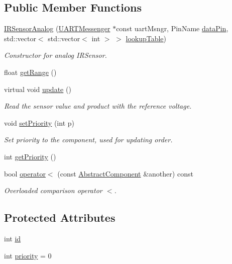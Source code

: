\subsection*{Public Member Functions}
\begin{DoxyCompactItemize}
\item 
\hyperlink{class_i_r_sensor_analog_af27166832035783b3df081014c4dfb9d}{I\+R\+Sensor\+Analog} (\hyperlink{class_u_a_r_t_messenger}{U\+A\+R\+T\+Messenger} $\ast$const uart\+Msngr, Pin\+Name \hyperlink{class_i_r_sensor_analog_a248c6a3f0a6a4e4867fd70c0ac0b3d76}{data\+Pin}, std\+::vector$<$ std\+::vector$<$ int $>$ $>$ \hyperlink{class_i_r_sensor_analog_a981d91e0de8f658d5c15ac5bfbe8ed6c}{lookup\+Table})
\begin{DoxyCompactList}\small\item\em Constructor for analog I\+R\+Sensor. \end{DoxyCompactList}\item 
float \hyperlink{class_i_r_sensor_analog_aa6642b85ec1018980e216eab0dfd27f2}{get\+Range} ()
\item 
virtual void \hyperlink{class_i_r_sensor_analog_a919942de7c5fc3af5da9a2b32e31d328}{update} ()
\begin{DoxyCompactList}\small\item\em Read the sensor value and product with the reference voltage. \end{DoxyCompactList}\item 
void \hyperlink{class_abstract_component_a58a59a9ea6c3b4c86fb3bf98ff1eaaef}{set\+Priority} (int p)
\begin{DoxyCompactList}\small\item\em Set priority to the component, used for updating order. \end{DoxyCompactList}\item 
int \hyperlink{class_abstract_component_ac0b440d1d642ff1292ec3c544d75a8f1}{get\+Priority} ()
\item 
bool \hyperlink{class_abstract_component_a0c2e458144111c5f599c66f168516abc}{operator$<$} (const \hyperlink{class_abstract_component}{Abstract\+Component} \&another) const
\begin{DoxyCompactList}\small\item\em Overloaded comparison operator \textquotesingle{}$<$\textquotesingle{}. \end{DoxyCompactList}\end{DoxyCompactItemize}
\subsection*{Protected Attributes}
\begin{DoxyCompactItemize}
\item 
int \hyperlink{class_abstract_component_a9c9c548149681b1a1dd935e66ed5dd11}{id}
\item 
int \hyperlink{class_abstract_component_aff57dfa5f31be093a06b55560e33fb95}{priority} = 0
\end{DoxyCompactItemize}
